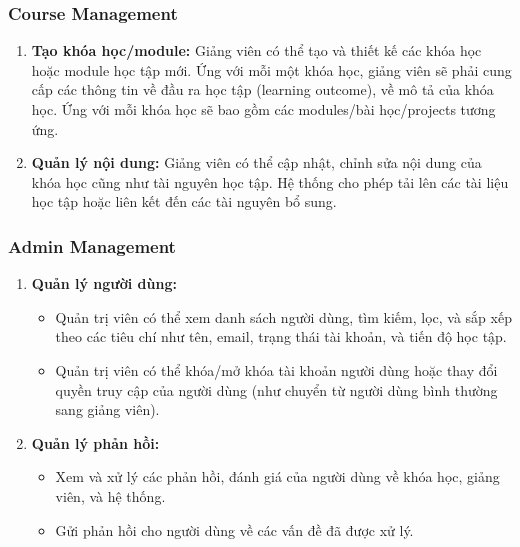 \subsubsection{Course Management}
\begin{enumerate}
    \item \textbf{Tạo khóa học/module:} Giảng viên có thể tạo và thiết kế các khóa học hoặc module học tập mới. Ứng với mỗi một khóa học, giảng viên sẽ phải cung cấp các thông tin về đầu ra học tập (learning outcome), về mô tả của khóa học. Ứng với mỗi khóa học sẽ bao gồm các modules/bài học/projects tương ứng.
\item \textbf{Quản lý nội dung:} Giảng viên có thể cập nhật, chỉnh sửa nội dung của khóa học cũng như tài nguyên học tập. Hệ thống cho phép tải lên các tài liệu học tập hoặc liên kết đến các tài nguyên bổ sung.
\end{enumerate}
\subsubsection{Admin Management}
\begin{enumerate}
    \item \textbf{Quản lý người dùng:} 
    \begin{itemize}
        \item Quản trị viên có thể xem danh sách người dùng, tìm kiếm, lọc, và sắp xếp theo các tiêu chí như tên, email, trạng thái tài khoản, và tiến độ học tập.
        \item Quản trị viên có thể khóa/mở khóa tài khoản người dùng hoặc thay đổi quyền truy cập của người dùng (như chuyển từ người dùng bình thường sang giảng viên).
    \end{itemize}
\item \textbf{Quản lý phản hồi:}
\begin{itemize}
    \item Xem và xử lý các phản hồi, đánh giá của người dùng về khóa học, giảng viên, và hệ thống.
    \item Gửi phản hồi cho người dùng về các vấn đề đã được xử lý.
\end{itemize}
\end{enumerate}
